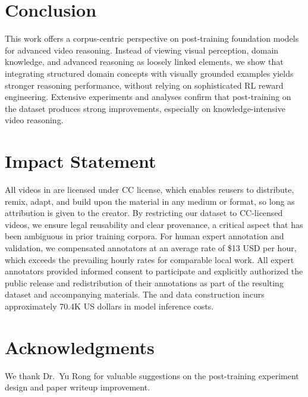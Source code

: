 \section{Conclusion}
This work offers a corpus-centric perspective on post-training foundation models for advanced video reasoning. Instead of viewing visual perception, domain knowledge, and advanced reasoning as loosely linked elements, we show that integrating structured domain concepts with visually grounded examples yields stronger reasoning performance, without relying on sophisticated RL reward engineering. Extensive experiments and analyses confirm that post-training on the \ours dataset produces strong improvements, especially on knowledge-intensive video reasoning.

\section*{Impact Statement}
All videos in \ours are licensed under CC license, which enables reusers to distribute, remix, adapt, and build upon the material in any medium or format, so long as attribution is given to the creator. By restricting our dataset to CC-licensed videos, we ensure legal reusability and clear provenance, a critical aspect that has been ambiguous in prior training corpora. 
For human expert annotation and validation, we compensated annotators at an average rate of \$13 USD per hour, which exceeds the prevailing hourly rates for comparable local work.
All expert annotators provided informed consent to participate and explicitly authorized the public release and redistribution of their annotations as part of the resulting dataset and accompanying materials.
The \ours and \eval data construction incurs approximately 70.4K US dollars in model inference costs.

\section*{Acknowledgments}
We thank Dr.~Yu Rong for valuable suggestions on the post-training experiment design and paper writeup improvement.

